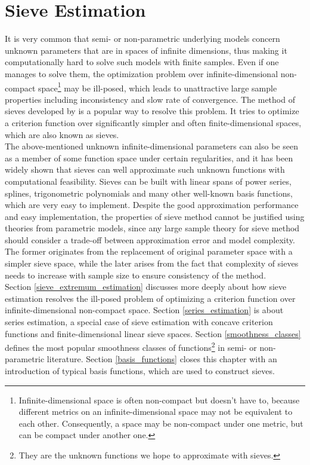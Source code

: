 \documentclass[12pt, a4paper]{article}
\theoremstyle{MAstyle} \newtheorem{assumption}{Assumption}[section]
\theoremstyle{MAstyle} \newtheorem{definition}{Definition}[section]
\theoremstyle{MAstyle} \newtheorem{theorem}{Theorem}[section]
\theoremstyle{MAstyle} \newtheorem{corollary}{Corollary}[section]
\begin{document}
	\section{Sieve Estimation}\label{sieve}
        It is very common that semi- or non-parametric underlying models concern unknown parameters that are in spaces of infinite dimensions, thus making it computationally hard to solve such models with finite samples. Even if one manages to solve them, the optimization problem over infinite-dimensional non-compact space\footnote{Infinite-dimensional space is often non-compact but doesn't have to, because different metrics on an infinite-dimensional space may not be equivalent to each other. Consequently, a space may be non-compact under one metric, but can be compact under another one.} may be ill-posed, which leads to unattractive large sample properties including inconsistency and slow rate of convergence. The method of sieves developed by \cite{Grenander_1981} is a popular way to resolve this problem. It tries to optimize a criterion function over significantly simpler and often finite-dimensional spaces, which are also known as sieves. \\
        
        The above-mentioned unknown infinite-dimensional parameters can also be seen as a member of some function space under certain regularities, and it has been widely shown that sieves can well approximate such unknown functions with computational feasibility. Sieves can be built with linear spans of power series, splines, trigonometric polynomials and many other well-known basis functions, which are very easy to implement. Despite the good approximation performance and easy implementation, the properties of sieve method cannot be justified using theories from parametric models, since any large sample theory for sieve method should consider a trade-off between approximation error and model complexity. The former originates from the replacement of original parameter space with a simpler sieve space, while the later arises from the fact that complexity of sieves needs to increase with sample size to ensure consistency of the method.\\

        Section \ref{sieve_extremum_estimation} discusses more deeply about how sieve estimation resolves the ill-posed problem of optimizing a criterion function over infinite-dimensional non-compact space. Section \ref{series_estimation} is about series estimation, a special case of sieve estimation with concave criterion functions and finite-dimensional linear sieve spaces. Section \ref{smoothness_classes} defines the most popular smoothness classes of functions\footnote{They are the unknown functions we hope to approximate with sieves.} in semi- or non-parametric literature. Section \ref{basis_functions} closes this chapter with an introduction of typical basis functions, which are used to construct sieves.
 
\end{document}
